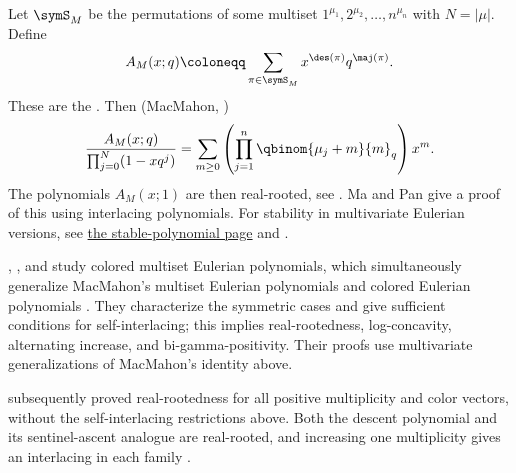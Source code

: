 \begin{example*}
Let $\symS_M$ be the permutations of some multiset
$1^{\mu_1},2^{\mu_2},\dotsc,n^{\mu_n}$ with $N=|\mu|$.
Define
\[
 A_M(x;q) \coloneqq  \sum_{\pi \in \symS_M } x^{\des(\pi)}q^{\maj(\pi)}.
\]
These are the \label{multiEulerianPolynomial}.
Then (MacMahon, \cite{MacMahon1960})
\[
 \frac{A_M(x;q)}{\prod_{j=0}^N (1-x q^j)}
 =
 \sum_{m \geq 0}
 \left(\prod_{j=1}^n \qbinom{\mu_j+m}{m}_q \right) x^m.
\]
The polynomials \(A_M(x;1)\) are then real-rooted, see
\cite[Section~2]{Simion1984}.  Ma and Pan \cite[Thm.~1.11]{MaPan2023}
give a proof of this using interlacing polynomials.
For stability in multivariate Eulerian versions, see
\hyperref[ex:stableMultivariateEulerianOperator]{the stable-polynomial page}
and \cite[Eq.~(4.7)]{BrandenHaglundVisontaiWagner2011}.

, , and 
study colored multiset Eulerian polynomials, which simultaneously generalize
MacMahon's multiset Eulerian polynomials and colored Eulerian polynomials
\cite{DeligeorgakiHanSolus2024x}.  They characterize the symmetric cases and
give sufficient conditions for self-interlacing; this implies real-rootedness,
log-concavity, alternating increase, and bi-gamma-positivity.  Their proofs
use multivariate generalizations of MacMahon's identity above.

 subsequently proved real-rootedness for all positive
multiplicity and color vectors, without the self-interlacing restrictions
above.  Both the descent polynomial and its sentinel-ascent analogue are
real-rooted, and increasing one multiplicity gives an interlacing in each
family \cite[Thms.~1.4--1.5]{Yan2026ColoredMultiset}.
\end{example*}

